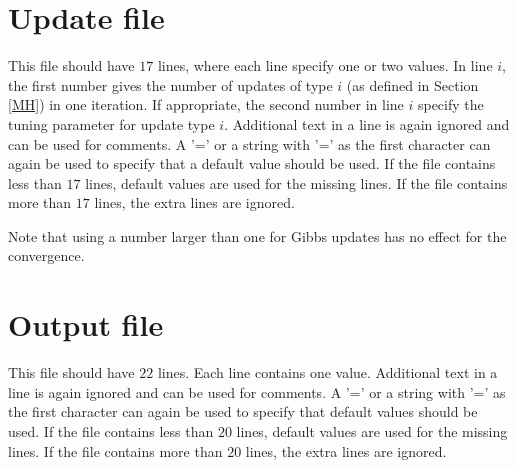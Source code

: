 \documentclass[11pt]{article}
\begin{document}
\section{Update file}
This file should have $17$ lines, where each line specify one or two values.
In line $i$, the first number gives the number of updates of type $i$
(as defined in Section \ref{MH}) in one iteration. If appropriate, the second
number in line $i$ specify the tuning parameter for update type $i$.
Additional text in a line is again ignored and can be used for comments. A '=' or a
string with '=' as the first character can again be used to specify that a default value
should be used. If the file contains less than $17$ lines,
default values are used for the missing lines. If the file contains more than 
$17$ lines, the extra lines are ignored.

Note that using a number larger than one for Gibbs updates has no effect for 
the convergence.

%

\section{\label{out}Output file}
This file should have $22$ lines. Each line contains one value.
Additional text in a line is again ignored and can be used for comments. A '=' or a
string with '=' as the first character can again be used to specify that default values
should be used. If the file contains less than $20$ lines,
default values are used for the missing lines. If the file contains more than 
$20$ lines, the extra lines are ignored.
\end{document}
